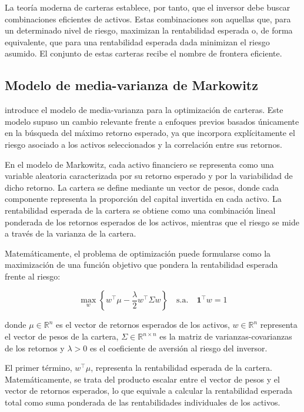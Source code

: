 La teoría moderna de carteras establece, por tanto, que el inversor debe buscar combinaciones eficientes de activos. Estas combinaciones son aquellas que, para un determinado nivel de riesgo, maximizan la rentabilidad esperada o, de forma equivalente, que para una rentabilidad esperada dada minimizan el riesgo asumido. El conjunto de estas carteras recibe el nombre de frontera eficiente.

\subsection{Modelo de media-varianza de Markowitz}

\cite{markowitz1952} introduce el modelo de media-varianza para la optimización de carteras. Este modelo supuso un cambio relevante frente a enfoques previos basados únicamente en la búsqueda del máximo retorno esperado, ya que incorpora explícitamente el riesgo asociado a los activos seleccionados y la correlación entre sus retornos.

En el modelo de Markowitz, cada activo financiero se representa como una variable aleatoria caracterizada por su retorno esperado y por la variabilidad de dicho retorno. La cartera se define mediante un vector de pesos, donde cada componente representa la proporción del capital invertida en cada activo. La rentabilidad esperada de la cartera se obtiene como una combinación lineal ponderada de los retornos esperados de los activos, mientras que el riesgo se mide a través de la varianza de la cartera.

Matemáticamente, el problema de optimización puede formularse como la maximización de una función objetivo que pondera la rentabilidad esperada frente al riesgo:

\begin{equation}
\max_{w} \left\{ w^{\top}\mu - \frac{\lambda}{2} w^{\top}\Sigma w \right\}
\quad \text{s.a.} \quad
\mathbf{1}^{\top}w = 1
\end{equation}

donde $\mu \in \mathbb{R}^n$ es el vector de retornos esperados de los activos, $w \in \mathbb{R}^n$ representa el vector de pesos de la cartera, $\Sigma \in \mathbb{R}^{n \times n}$ es la matriz de varianzas-covarianzas de los retornos y $\lambda > 0$ es el coeficiente de aversión al riesgo del inversor.

El primer término, $w^\top \mu$, representa la rentabilidad esperada de la cartera. Matemáticamente, se trata del producto escalar entre el vector de pesos y el vector de retornos esperados, lo que equivale a calcular la rentabilidad esperada total como suma ponderada de las rentabilidades individuales de los activos.

